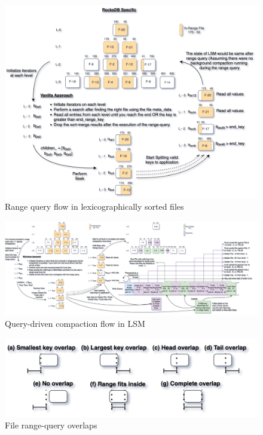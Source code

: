 
\begin{figure}
    \includegraphics[scale=0.10]{Figures/Vanilla Range Query rocksdb specific.png}
    \caption{Range query flow in lexicographically sorted files}\label{fig:rocksdb_specific_vanilla_range_query}
\end{figure}


\begin{figure}
    \includegraphics[scale=0.10]{Figures/RQ-driven numeric key sorting.png}
    \caption{Query-driven compaction flow in LSM}\label{fig:query-driven_compaction}
\end{figure}

\begin{figure}
    \includegraphics[scale=0.2]{Figures/File range overlaps.png}
    \caption{File range-query overlaps}\label{fig:file_range_overlaps}
\end{figure}

